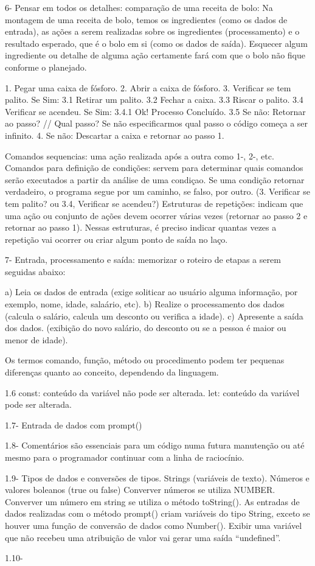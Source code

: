 6- Pensar em todos os detalhes: comparação de uma receita de bolo:
Na montagem de uma receita de bolo, temos os ingredientes (como os dados de entrada), as ações a serem realizadas sobre os
ingredientes (processamento) e o resultado esperado, que é o bolo em si (como os dados de saída). Esquecer algum ingrediente
ou detalhe de alguma ação certamente fará com que o bolo não fique conforme o planejado.

1. Pegar uma caixa de fósforo.
2. Abrir a caixa de fósforo.
3. Verificar se tem palito. Se Sim:
3.1 Retirar um palito.
3.2 Fechar a caixa.
3.3 Riscar o palito.
3.4 Verificar se acendeu. Se Sim:
3.4.1 Ok! Processo Concluído.
3.5 Se não: Retornar ao passo? // Qual passo? Se não especificarmos qual passo o código começa a ser infinito.
4. Se não: Descartar a caixa e retornar ao passo 1.

Comandos sequencias: uma ação realizada após a outra como 1-, 2-, etc.
Comandos para definição de condições: servem para determinar quais comandos serão executados a partir da análise de uma condiçao.
Se  uma condição retornar verdadeiro, o programa segue por um caminho, se falso, por outro. (3. Verificar se tem palito? ou 3.4, Verificar se
acendeu?)
Estruturas de repetições: indicam que uma ação ou conjunto de ações devem ocorrer várias vezes  (retornar ao passo 2 e retornar ao passo
1). Nessas estruturas, é preciso indicar quantas vezes a repetição vai ocorrer ou criar algum ponto de saída no laço.

7- Entrada, processamento e saída: memorizar o roteiro de etapas a serem seguidas abaixo:

a) Leia os dados de entrada (exige soliticar ao usuário alguma informação, por exemplo, nome, idade, salaário, etc).
b) Realize o processamento dos dados (calcula o salário, calcula um desconto ou verifica a idade).
c) Apresente a saída dos dados. (exibição do novo salário, do desconto ou se a pessoa é maior ou menor de idade).

Os termos comando, função, método ou
procedimento podem ter pequenas diferenças quanto ao conceito, dependendo da linguagem.

1.6
const: conteúdo da variável não pode ser alterada.
let: conteúdo da variável pode ser alterada.

1.7- Entrada de dados com prompt()

1.8- Comentários são essenciais para um código numa futura manutenção
ou até mesmo para o programador continuar com a linha de raciocínio.

1.9- Tipos de dados e conversões de tipos.
Strings (variáveis de texto).
Números e valores boleanos (true ou false)
Converver números se utiliza NUMBER.
Converver um número em string se utiliza o método toString().
As entradas de dados realizadas com o método prompt()
criam variáveis do tipo String, exceto se houver uma função de conversão de
dados como Number(). Exibir uma variável que não recebeu uma atribuição
de valor vai gerar uma saída “undefined”.

1.10- 
